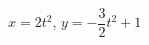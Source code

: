 \hspace*{2mm}\begin{minipage}[t]{\dimexpr\linewidth-2mm\relax}\vspace{0pt}
$x=2t^2$, $y=-\dfrac{3}{2}t^2+1$\end{minipage}
